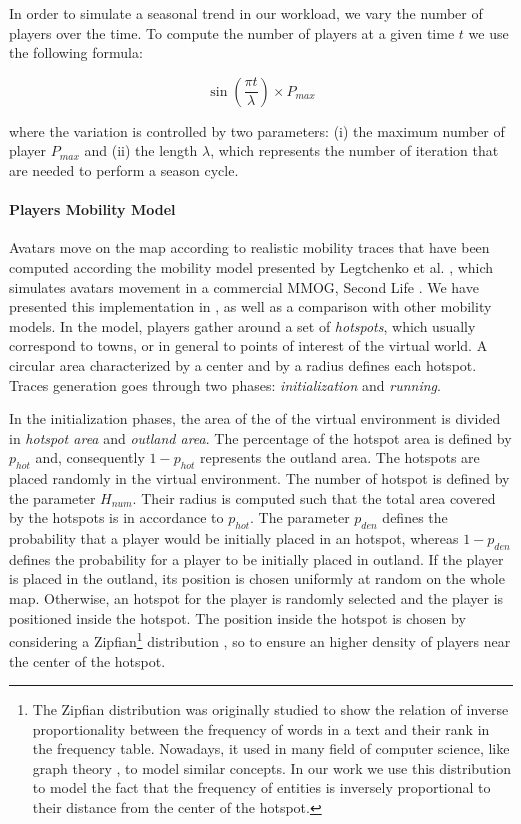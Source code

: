 \documentclass[final,10pt,a5paper]{phdimt}
\theoremstyle{definition}
\begin{document}
In order to simulate a seasonal trend in our workload, we vary the number of players over the time. To compute the number of players at a given time $t$ we use the following formula:

\begin{equation}
\sin(\frac{\pi t}{\lambda}) \times P_{max}
\end{equation}

\noindent
where the variation is controlled by two parameters: (i) the maximum number of player $P_{max}$ and (ii) the length $\lambda$, which represents the number of iteration that are needed to perform a season cycle. 


\paragraph{Players Mobility Model}

Avatars move on the map according to realistic mobility traces that have been computed according the mobility model presented by Legtchenko et al.  \cite{Legtchenko2010},  which simulates avatars movement in a commercial MMOG, Second Life \cite{sl-site}.
We have presented this implementation in \cite{carlini2011evaluating}, as well as a comparison with other mobility models.
In the model, players gather around a set of {\em hotspots}, which usually correspond to towns, or in general to points of interest of the virtual world. A circular area characterized by a center and by a radius defines each hotspot.
Traces generation goes through two phases: \textit{initialization} and \textit{running}.



In the initialization phases, the area of the of the virtual environment is divided in \textit{hotspot area} and \textit{outland area}. The percentage of the hotspot area is defined by $p_{hot}$ and, consequently $1 - p_{hot}$ represents the outland area.
The hotspots are placed randomly in the virtual environment. The number of hotspot is defined by the parameter $H_{num}$. Their radius is computed such that the total area covered by the hotspots is in accordance to $p_{hot}$.
The parameter $p_{den}$ defines the probability that a player would be initially placed in an hotspot, whereas $1 - p_{den}$ defines the probability for a player to be initially placed in outland. 
If the player is placed in the outland, its position is chosen uniformly at random on the whole map.
Otherwise, an hotspot for the player is randomly selected and the player is positioned inside the hotspot.
The position inside the hotspot is chosen by considering a Zipfian\footnote{The Zipfian distribution was originally studied to show the relation of inverse proportionality between the frequency of words in a text and their rank in the frequency table. Nowadays, it used in many field of computer science, like graph theory \cite{broder2000graph},  to model similar concepts. In our work we use this distribution to model the fact that the frequency of entities is inversely proportional to their distance from the center of the hotspot.} distribution \cite{newman2005power}, so to ensure an higher density of players near the center of the hotspot.
\end{document}
